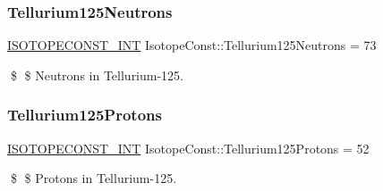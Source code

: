 \subsubsection{\texorpdfstring{Tellurium125\+Neutrons}{Tellurium125Neutrons}}
{\footnotesize\ttfamily \mbox{\hyperlink{group___isotope_const-_macros_ga5f18360b3e99483a35c32d789e62621c}{I\+S\+O\+T\+O\+P\+E\+C\+O\+N\+S\+T\+\_\+\+I\+NT}} Isotope\+Const\+::\+Tellurium125\+Neutrons = 73}

\$ \$ Neutrons in Tellurium-\/125. \mbox{\label{group___isotope_const-_tellurium-_te125_gae98a4c150c440569a700a167c1aa8755}} 
\subsubsection{\texorpdfstring{Tellurium125\+Protons}{Tellurium125Protons}}
{\footnotesize\ttfamily \mbox{\hyperlink{group___isotope_const-_macros_ga5f18360b3e99483a35c32d789e62621c}{I\+S\+O\+T\+O\+P\+E\+C\+O\+N\+S\+T\+\_\+\+I\+NT}} Isotope\+Const\+::\+Tellurium125\+Protons = 52}

\$ \$ Protons in Tellurium-\/125. 